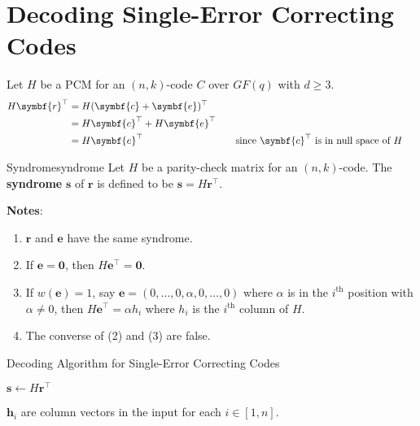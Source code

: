 \section{Decoding Single-Error Correcting Codes}
Let $ H $ be a PCM for an $ (n,k) $-code $ C $ over $ GF(q) $
with $ d\geqslant 3 $.
\begin{align*}
    H\symbf{r}^\top
     & =H(\symbf{c}+\symbf{e})^\top                                                                          \\
     & =H\symbf{c}^\top+H \symbf{e}^\top                                                                     \\
     & =H\symbf{e}^\top                  & \quad & \text{since $ \symbf{c}^\top $ is in null space of $ H$ }
\end{align*}

\begin{Definition}{Syndrome}{syndrome}
    Let $ H $ be a parity-check matrix for an $ (n,k) $-code.
    The \textbf{syndrome} $ \symbf{s} $ of $ \symbf{r} $
    is defined to be $ \symbf{s}=H\symbf{r}^\top $.
\end{Definition}

\textbf{Notes}:
\begin{enumerate}[label=(\arabic*)]
    \item $ \symbf{r} $ and $ \symbf{e} $ have the same syndrome.
    \item If $ \symbf{e}=\symbf{0} $, then $ H\symbf{e}^\top=\symbf{0} $.
    \item If $ w(\symbf{e})=1 $, say $ \symbf{e}=(0,\ldots,0,\alpha,0,\ldots,0) $
          where $ \alpha $ is in the $ i^{\text{th}} $ position with $ \alpha \neq 0 $,
          then $ H\symbf{e}^\top=\alpha h_i $ where $ h_i $ is the $ i^{\text{th}} $
          column of $ H $.
    \item The converse of (2) and (3) are false.
\end{enumerate}

\begin{algorithm}
    \DontPrintSemicolon{}
    \caption{Decoding Algorithm for Single-Error Correcting Codes}\label{alg:Decoding Algorithm for Single-Error Correcting Codes}

    $ \symbf{s}\gets H\symbf{r}^\top $\;
     {
    }
     {
         {
        }
    }
    \Return{}
\end{algorithm}
\begin{Remark}{}{}
    $ \symbf{h}_i $ are column vectors in the input for each $ i\in[1,n] $.
\end{Remark}

